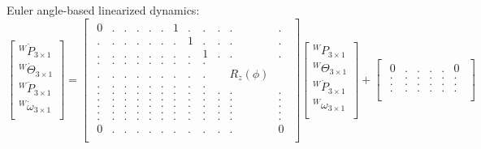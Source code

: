 \documentclass{article}
\begin{document}
Euler angle-based linearized dynamics:
\begin{equation}
	\begin{bmatrix}
	{}^W\dot{P}_{3 \times 1}\\
	{}^W\dot{\Theta}_{3 \times 1}\\
	{}^W\ddot{P}_{3 \times 1}\\
	{}^W\dot{\omega}_{3 \times 1}\\
	\end{bmatrix} = 
	\begin{bmatrix}
	\begin{array}{cccccccccccc}
		0 & . & . & . & . & . & 1 & . & . & . & . & .  \\
		. & . & . & . & . & . & . & 1 & . & . & . & .  \\
		. & . & . & . & . & . & . & . & 1 & . & . & .  \\
		. & . & . & . & . & . & . & . & . &   &   &    \\
		. & . & . & . & . & . & . & . & . &   & R_z(\phi) &    \\
		. & . & . & . & . & . & . & . & . &   &   &    \\
		. & . & . & . & . & . & . & . & . & . & . & .  \\
		. & . & . & . & . & . & . & . & . & . & . & .  \\
		. & . & . & . & . & . & . & . & . & . & . & .  \\
		. & . & . & . & . & . & . & . & . & . & . & .  \\
		. & . & . & . & . & . & . & . & . & . & . & .  \\
		0 & . & . & . & . & . & . & . & . & . & . & 0  \\
	\end{array}
	\end{bmatrix}
	\begin{bmatrix}
	{}^WP_{3 \times 1}\\
	{}^W\Theta_{3 \times 1}\\
	{}^W\dot{P}_{3 \times 1}\\
	{}^W{\omega}_{3 \times 1}\\
	\end{bmatrix} + 
	\begin{bmatrix}
	\begin{array}{cccccc}
		0 & . & . & . & . & 0 \\
		. & . & . & . & . & . \\
		. & . & . & . & . & . \\
		. & . & . & . & . & . \\

\end{array}
\end{bmatrix}
\end{equation}
\end{document}
